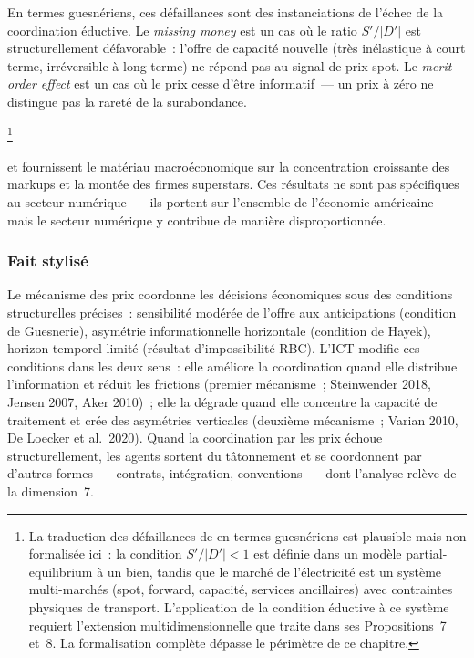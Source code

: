 En termes guesnériens, ces défaillances sont des instanciations de l'échec de la coordination éductive. Le \emph{missing money} est un cas où le ratio $S'/|D'|$ est structurellement défavorable~: l'offre de capacité nouvelle (très inélastique à court terme, irréversible à long terme) ne répond pas au signal de prix spot. Le \emph{merit order effect} est un cas où le prix cesse d'être informatif~--- un prix à zéro ne distingue pas la rareté de la surabondance.

\footnote{La traduction des défaillances de \textcite{cramton_electricity_2017} en termes guesnériens est plausible mais non formalisée ici~: la condition $S'/|D'|<1$ est définie dans un modèle partial-equilibrium à un bien, tandis que le marché de l'électricité est un système multi-marchés (spot, forward, capacité, services ancillaires) avec contraintes physiques de transport. L'application de la condition éductive à ce système requiert l'extension multidimensionnelle que \textcite{guesnerie_eductive_1992} traite dans ses Propositions~7 et~8. La formalisation complète dépasse le périmètre de ce chapitre.}

\textcite{deloecker_rise_2020} et \textcite{autor_fall_2020} fournissent le matériau macroéconomique sur la concentration croissante des markups et la montée des firmes superstars. Ces résultats ne sont pas spécifiques au secteur numérique~--- ils portent sur l'ensemble de l'économie américaine~--- mais le secteur numérique y contribue de manière disproportionnée.


\subsubsection{Fait stylisé}

Le mécanisme des prix coordonne les décisions économiques sous des conditions structurelles précises~: sensibilité modérée de l'offre aux anticipations (condition de Guesnerie), asymétrie informationnelle horizontale (condition de Hayek), horizon temporel limité (résultat d'impossibilité RBC). L'ICT modifie ces conditions dans les deux sens~: elle améliore la coordination quand elle distribue l'information et réduit les frictions (premier mécanisme~; Steinwender 2018, Jensen 2007, Aker 2010)~; elle la dégrade quand elle concentre la capacité de traitement et crée des asymétries verticales (deuxième mécanisme~; Varian 2010, De Loecker et al.\ 2020). Quand la coordination par les prix échoue structurellement, les agents sortent du tâtonnement et se coordonnent par d'autres formes~--- contrats, intégration, conventions~--- dont l'analyse relève de la dimension~7.

